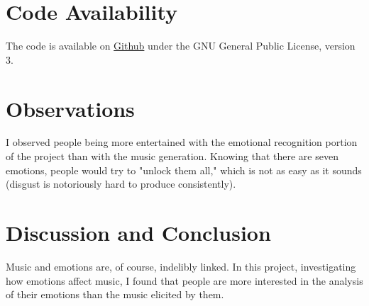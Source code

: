 \documentclass{article}
\renewcommand{\_}[1]{\underline{ #1 }}
\theoremstyle{definition}
\begin{document}
\section[Code Availability]{Code Availability}

The code is available on \href{https://github.com/as4mo3/face-the-music/}{Github} under the GNU General Public License, version 3. 

\section[Observations]{Observations}
\label{Observations}

I observed people being more entertained with the emotional recognition portion of the project than with the music generation. Knowing that there are seven emotions, people would try to "unlock them all," which is not as easy as it sounds (disgust is notoriously hard to produce consistently). 

\section[Discussion and Conclusion]{Discussion and Conclusion}
\label{Discussion and Conclusion}

Music and emotions are, of course, indelibly linked. In this project, investigating how emotions affect music, I found that people are more interested in the analysis of their emotions than the music elicited by them. 



\cleardoublepage
\ifdefined{}
\else
\fi

% 
\nocite{*} %
\printbibliography



\end{document}
